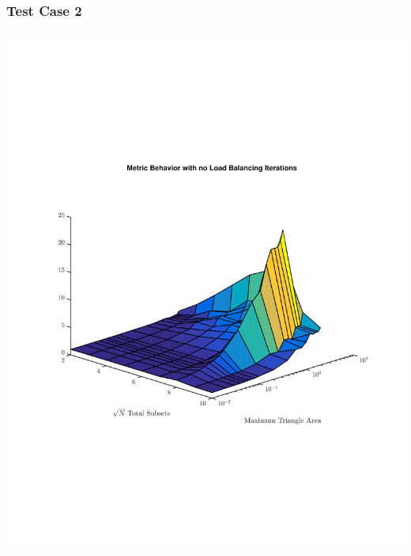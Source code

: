 \documentclass[]{beamer}
\begin{document}
\begin{frame}[t]\frametitle{Test Case 2}
\includegraphics[scale=0.47, trim = 0cm 8cm 0cm 7cm]{figures/SameNoIter.pdf}
\end{frame}
\end{document}
